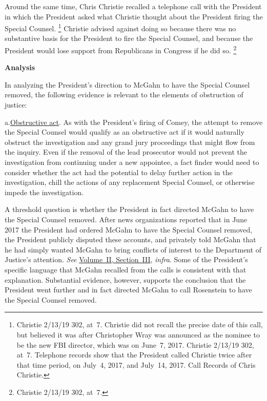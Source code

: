 Around the same time, Chris Christie recalled a telephone call with the President in which the President asked what Christie thought about the President firing the Special Counsel.%
\footnote{Christie 2/13/19 302, at~7.
Christie did not recall the precise date of this call, but believed it was after Christopher Wray was announced as the nominee to be the new FBI director, which was on June~7, 2017.
Christie 2/13/19 302, at~7.
Telephone records show that the President called Christie twice after that time period, on July~4, 2017, and July~14, 2017.
Call Records of Chris Christie.}
Christie advised against doing so because there was no substantive basis for the President to fire the Special Counsel, and because the President would lose support from Republicans in Congress if he did so.%
\footnote{Christie 2/13/19 302, at~7.}

\begin{center}
\textbf{Analysis}
\end{center}

In analyzing the President's direction to McGahn to have the Special Counsel removed, the following evidence is relevant to the elements of obstruction of justice:

a.\qquad\underline{Obstructive act}.
As with the President's firing of Comey, the attempt to remove the Special Counsel would qualify as an obstructive act if it would naturally obstruct the investigation and any grand jury proceedings that might flow from the inquiry.
Even if the removal of the lead prosecutor would not prevent the investigation from continuing under a new appointee, a fact finder would need to consider whether the act had the potential to delay further action in the investigation, chill the actions of any replacement Special Counsel, or otherwise impede the investigation.

A threshold question is whether the President in fact directed McGahn to have the Special Counsel removed.
After news organizations reported that in June 2017 the President had ordered McGahn to have the
Special Counsel removed, the President publicly disputed these accounts, and privately told McGahn that he had simply wanted McGahn to bring conflicts of interest to the Department of Justice's attention.
\textit{See} \hyperlink{section.2.3}{Volume~II, Section~III}, \textit{infra}.
Some of the President's specific language that McGahn recalled from the calls is consistent with that explanation.
Substantial evidence, however, supports the conclusion that the President went further and in fact directed McGahn to call Rosenstein to have the Special Counsel removed.

